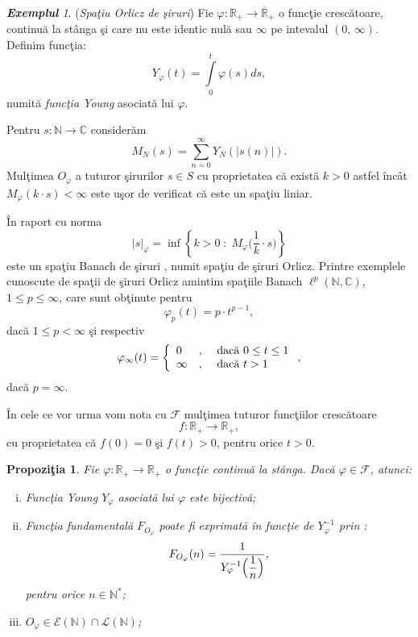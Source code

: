 \documentclass[ a4paper, 12pt]{report}
\newtheorem{prop}[theorem]{\bf Propozi\c tia }
\theoremstyle{definition}
\theoremstyle{remark}
\newtheorem{exemple}{\bf Exemplul}[section]
\numberwithin{equation}{section}
\begin{document}
\begin{exemple} ({\it Spa\c tiu Orlicz de \c siruri})
Fie $\varphi : \mathbb{R}_{+} \rightarrow \overline{\mathbb{R}}_{+}$ o func\c tie cresc\u atoare, continu\u a la st\^anga \c si care nu este identic nul\u a sau $\infty$ pe intevalul $(0,\, \infty)$.
Definim func\c tia:
$$ Y_\varphi (t) = \int\limits_{0}^{t} \varphi(s) ds,$$ numit\u a {\it func\c tia Young} asociat\u a lui $\varphi$.

Pentru $s : \mathbb{N} \rightarrow \mathbb{C}$ consider\u am
$$M_N (s)= \sum\limits_{n=0}^{\infty} Y_N(\lvert s(n) \rvert).$$
Mul\c timea $O_\varphi$ a  tuturor \c sirurilor $s \in S$ cu proprietatea c\u a exist\u a $k > 0$ astfel \^inc\^at $M_\varphi(k \cdot s)< \infty$ este u\c sor de verificat c\u a este un spa\c tiu liniar.

\^In raport cu norma
$$\lvert s \rvert_\varphi = \inf\left\{ k>0 \; : \; M_\varphi\Big(\frac{1}{k} \cdot s\Big) \right\}$$ este un spa\c tiu Banach de \c siruri , numit spa\c tiu de \c siruri Orlicz.
Printre exemplele cunoscute de spa\c tii de \c siruri Orlicz amintim spa\c tiile Banach $\ell^{p}(\mathbb{N},\mathbb{C})$, $1 \leq p \leq \infty$, care sunt ob\c tinute pentru
$$\varphi_p(t) = p \cdot t^{p-1},$$ dac\u a $1 \leq p < \infty$ \c si respectiv $$\varphi_\infty(t) = \left\{ \begin{array}{lcl}
0&,& \hbox{ dac\u a } 0 \leq t \leq 1\\
\infty &,& \hbox{ dac\u a } t > 1 \end{array} \right.,$$ dac\u a $p =\infty$.
\end{exemple}

\medskip

\^In cele ce vor urma vom nota cu $\mathcal{F}$ mul\c timea tuturor func\c tiilor cresc\u atoare
$$f : \mathbb{R}_{+} \rightarrow \mathbb{R}_{+},$$ cu proprietatea c\u a $f(0) = 0$ \c si  $f(t) > 0$, pentru orice $t > 0$.

\begin{prop}
Fie $\varphi : \mathbb{R}_{+} \rightarrow \mathbb{R}_{+}$ o func\c tie continu\u a la st\^anga. Dac\u a $\varphi \in \mathcal{F}$, atunci:
\begin{enumerate}[(i)]
\item Func\c tia Young $Y_\varphi$ asociat\u a lui $\varphi$ este bijectiv\u a;

\item Func\c tia fundamental\u a $F_{O_{\varphi}}$ poate fi exprimat\u a \^in func\c tie de $Y_\varphi^{-1}$ prin :
$$F_{O_{\varphi}} (n) = \frac{1}{Y_{\varphi}^{-1}\Big(\displaystyle\frac{1}{n}\Big)},$$ pentru orice $n \in \mathbb{N}^{\ast}$;

\item $O_\varphi \in \mathcal{E}(\mathbb{N}) \cap \mathcal{L}(\mathbb{N})$;
\end{enumerate}
\end{prop}
\end{document}
